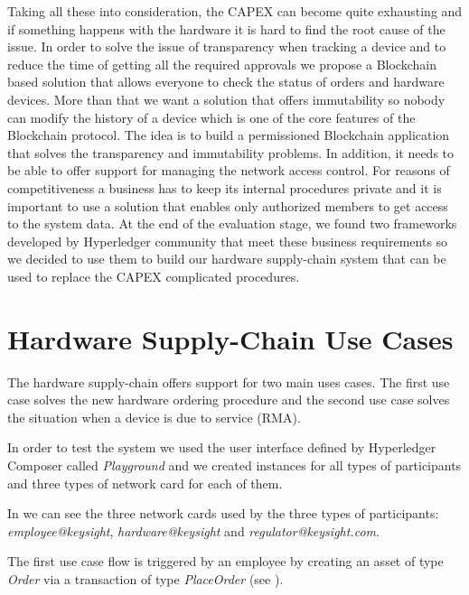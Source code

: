 Taking all these into consideration, the CAPEX can become quite exhausting and if something happens with the hardware it is hard to find the root cause of the issue. In order to solve the issue of transparency when tracking a device and to reduce the time of getting all the required approvals we propose a Blockchain based solution that allows everyone to check the status of orders and hardware devices. More than that we want a solution that offers immutability so nobody can modify the history of a device which is one of the core features of the Blockchain protocol.
The idea is to build a permissioned Blockchain application that solves the transparency and immutability problems. In addition, it needs to be able to offer support for managing the network access control.
For reasons of competitiveness a business has to keep its internal procedures private and it is important to use a solution that enables only authorized members to get access to the system data.
At the end of the evaluation stage, we found two frameworks developed by Hyperledger community that meet these business requirements so we decided to use them to build our hardware supply-chain system that can be used to replace the CAPEX complicated procedures.

\section{Hardware Supply-Chain Use Cases}
\label{sec:chapter4-section2}
The hardware supply-chain offers support for two main uses cases. The first use case solves the new hardware ordering procedure and the second use case solves the situation when a device is due to service (RMA).

In order to test the {\project} system we used the user interface defined by Hyperledger Composer called \emph{Playground} \cite{composer-playground} and we created instances for all types of participants and three types of network card for each of them. 

In  we can see the three network cards used by the three types of participants: \emph{employee@keysight}, \emph{hardware@keysight} and \emph{regulator@keysight.com}.


The first use case flow is triggered by an employee by creating an asset of type \emph{Order} via a transaction of type \emph{PlaceOrder} (see ). 

